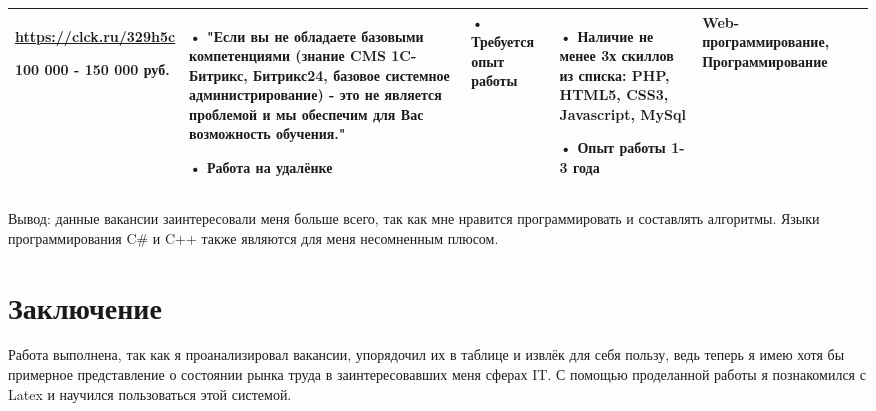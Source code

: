 \begin{landscape}
\begin{table}[H]
\begin{center}
\begin{small}
\begin{tabular}{|p{0.1cm}|p{5cm}|p{4.5cm}|p{4.5cm}|p{4cm}|p{3cm}|}
			\url{https://clck.ru/329h5c}
			
			100 000 - 150 000 руб. &
			• "Если вы не обладаете базовыми компетенциями (знание CMS 1C-Битрикс, Битрикс24, базовое системное администрирование) - это не является проблемой и мы обеспечим для Вас возможность обучения."
			
			• Работа на удалёнке
			&
			• Требуется опыт работы
			&
			• Наличие не менее 3х скиллов из списка: PHP, HTML5, CSS3, Javascript, MySql
			
			• Опыт работы 1-3 года
			&
			Web-программирование, Программирование
			\\
			\hline
			\end{tabular}
		\end{small}
	\end{center}
\end{table}			
Вывод: данные вакансии заинтересовали меня больше всего, так как мне нравится программировать и составлять алгоритмы. Языки программирования C\# и C++ также являются для меня несомненным плюсом.
 
 
\end{landscape}

\section*{Заключение}
Работа выполнена, так как я проанализировал вакансии, упорядочил их в таблице и извлёк для себя пользу, ведь теперь я имею хотя бы примерное представление о состоянии рынка труда в заинтересовавших меня сферах IT. С помощью проделанной работы я познакомился с Latex и научился пользоваться этой системой.

